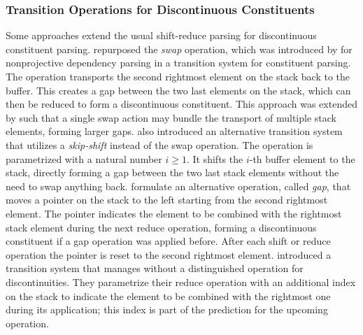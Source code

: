 \documentclass[../document.tex]{subfiles}
\begin{document}
    \subsubsection*{Transition Operations for Discontinuous Constituents}
    Some approaches extend the usual shift-reduce parsing for discontinuous constituent parsing.
    \citet{Verseley14b} repurposed the \emph{swap} operation, which was introduced by \citet{Nivre09} for nonprojective dependency parsing in a transition system for constituent parsing.
    The operation transports the second rightmost element on the stack back to the buffer.
    This creates a gap between the two last elements on the stack, which can then be reduced to form a discontinuous constituent.
    This approach was extended by \citet{Maier15} such that a single swap action may bundle the transport of multiple stack elements, forming larger gaps.
    \citet{Maier16} also introduced an alternative transition system that utilizes a \emph{skip-shift} instead of the swap operation.
    The operation is parametrized with a natural number \(i \ge 1\). It shifts the \(i\)-th buffer element to the stack, directly forming a gap between the two last stack elements without the need to swap anything back.
    \citet{Coavoux17} formulate an alternative operation, called \emph{gap}, that moves a pointer on the stack to the left starting from the second rightmost element.
    The pointer indicates the element to be combined with the rightmost stack element during the next reduce operation, forming a discontinuous constituent if a gap operation was applied before. 
    After each shift or reduce operation the pointer is reset to the second rightmost element.
    \citet{CoaCoh19} introduced a transition system that manages without a distinguished operation for discontinuities.
    They parametrize their reduce operation with an additional index on the stack to indicate the element to be combined with the rightmost one during its application; this index is part of the prediction for the upcoming operation.
\end{document}
